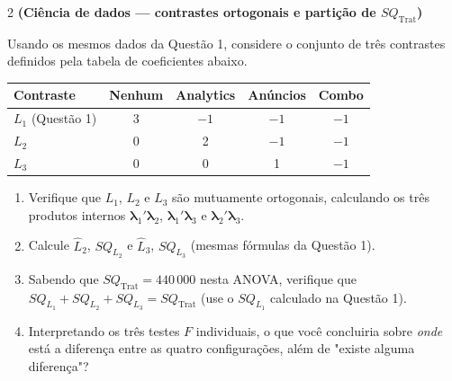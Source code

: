 \documentclass[11pt]{article}
\begin{document}
\begin{questao}{2} \textbf{(Ciência de dados --- contrastes ortogonais e partição de $SQ_{\text{Trat}}$)}

Usando os mesmos dados da Questão 1, considere o conjunto de três contrastes definidos pela
tabela de coeficientes abaixo.

\begin{center}
\begin{tabular}{lcccc}
\toprule
Contraste & Nenhum & Analytics & Anúncios & Combo \\
\midrule
$L_1$ (Questão 1) & 3 & $-1$ & $-1$ & $-1$ \\
$L_2$ & 0 & 2 & $-1$ & $-1$ \\
$L_3$ & 0 & 0 & 1 & $-1$ \\
\bottomrule
\end{tabular}
\end{center}

\begin{enumerate}[label=(\alph*)]
  \item Verifique que $L_1$, $L_2$ e $L_3$ são mutuamente ortogonais, calculando os três produtos
    internos $\boldsymbol\lambda_1'\boldsymbol\lambda_2$, $\boldsymbol\lambda_1'\boldsymbol\lambda_3$
    e $\boldsymbol\lambda_2'\boldsymbol\lambda_3$.
  \item Calcule $\hat L_2$, $SQ_{L_2}$ e $\hat L_3$, $SQ_{L_3}$ (mesmas fórmulas da Questão 1).
  \item Sabendo que $SQ_{\text{Trat}} = 440\,000$ nesta ANOVA, verifique que
    $SQ_{L_1} + SQ_{L_2} + SQ_{L_3} = SQ_{\text{Trat}}$ (use o $SQ_{L_1}$ calculado na Questão 1).
  \item Interpretando os três testes $F$ individuais, o que você concluiria sobre \emph{onde}
    está a diferença entre as quatro configurações, além de "existe alguma diferença"?
\end{enumerate}
\end{questao}
\end{document}
